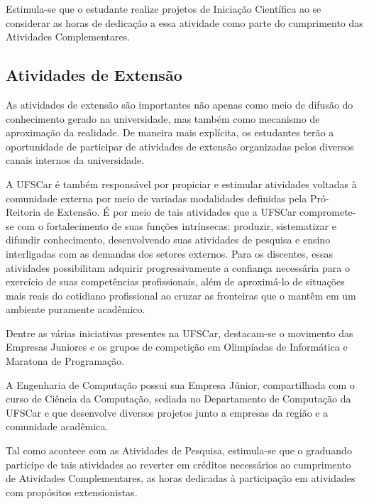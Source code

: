 Estimula-se que o estudante realize projetos de Iniciação Científica ao se considerar as horas de dedicação a essa atividade como parte do cumprimento das Atividades Complementares.

\subsection{Atividades de Extensão}


As atividades de extensão são importantes não apenas como meio de difusão do conhecimento gerado na universidade, mas também como mecanismo de aproximação da realidade. De maneira mais explícita, os estudantes terão a oportunidade de participar de atividades de extensão organizadas pelos diversos canais internos da universidade.

A UFSCar é também responsável por propiciar e estimular atividades voltadas à comunidade externa por meio de variadas modalidades definidas pela Pró-Reitoria de Extensão. É por meio de tais atividades que a UFSCar compromete-se com o fortalecimento de suas funções intrínsecas: produzir, sistematizar e difundir conhecimento, desenvolvendo suas atividades de pesquisa e ensino interligadas com as demandas dos setores externos. Para os discentes, essas atividades possibilitam adquirir progressivamente a confiança necessária para o exercício de suas competências profissionais, além de aproximá-lo de situações mais reais do cotidiano profissional ao cruzar as fronteiras que o mantêm em um ambiente puramente acadêmico.

Dentre as várias iniciativas presentes na UFSCar, destacam-se o movimento das Empresas Juniores e os grupos de competição em Olimpíadas de Informática e Maratona de Programação.

A Engenharia de Computação possui sua Empresa Júnior, compartilhada com o curso de Ciência da Computação, sediada no Departamento de Computação da UFSCar e que desenvolve diversos projetos junto a empresas da região e a comunidade acadêmica.

Tal como acontece com as Atividades de Pesquisa, estimula-se que o graduando participe de tais atividades ao reverter em créditos necessários ao cumprimento de Atividades Complementares, as horas dedicadas à participação em atividades com propósitos extensionistas.
